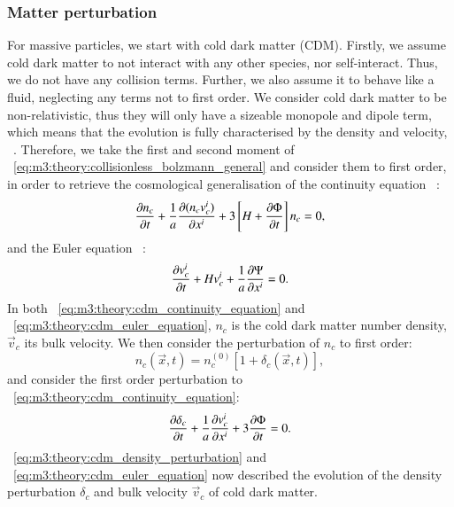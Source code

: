 \subsubsection{Matter perturbation}
    For massive particles, we start with cold dark matter (CDM). Firstly, we assume cold dark matter to not interact with any other species, nor self-interact. Thus, we do not have any collision terms. Further, we also assume it to behave like a fluid, neglecting any terms not to first order. We consider cold dark matter to be non-relativistic, thus they will only have a sizeable monopole and dipole term, which means that the evolution is fully characterised by the density and velocity, ~\cite{AST5220LectureNotes}.  Therefore, we take the first and second moment of ~\cref{eq:m3:theory:collisionless_bolzmann_general} and consider them to first order, in order to retrieve the cosmological generalisation of the continuity equation ~\cite[Eq. 5.41]{dodelson2020modern}:
    \begin{equation}\label{eq:m3:theory:cdm_continuity_equation}
        \pdv{n_c}{t}+\frac{1}{a}\pdv{(n_cv_c^i)}{x^i} + 3\left[H+\pdv{\Phi}{t}\right]n_c=0,
    \end{equation}
    and the Euler equation ~\cite[Eq. 5.50]{dodelson2020modern}:
    \begin{equation}\label{eq:m3:theory:cdm_euler_equation}
        \pdv{v_c^i}{t} + Hv_c^i + \frac{1}{a}\pdv{\Psi}{x^i} = 0.
    \end{equation}
    In both ~\cref{eq:m3:theory:cdm_continuity_equation} and ~\cref{eq:m3:theory:cdm_euler_equation}, $n_c$ is the cold dark matter number density, $\vec{v}_c$ its bulk velocity. We then consider the perturbation of $n_c$ to first order:
    \begin{equation}\label{eq:m3:theory:cdm_number_density_perturbation}
        n_c(\vec{x}, t) = n_c^{(0)}[1+\delta_c(\vec{x},t)],
    \end{equation}
    and consider the first order perturbation to ~\cref{eq:m3:theory:cdm_continuity_equation}:
    \begin{equation}\label{eq:m3:theory:cdm_density_perturbation}
        \pdv{\delta_c}{t}+\frac{1}{a}\pdv{v_c^i}{x^i} + 3\pdv{\Phi}{t} = 0.
    \end{equation}
    ~\cref{eq:m3:theory:cdm_density_perturbation} and ~\cref{eq:m3:theory:cdm_euler_equation} now described the evolution of the density perturbation $\delta_c$ and bulk velocity $\vec{v}_c$ of cold dark matter.

